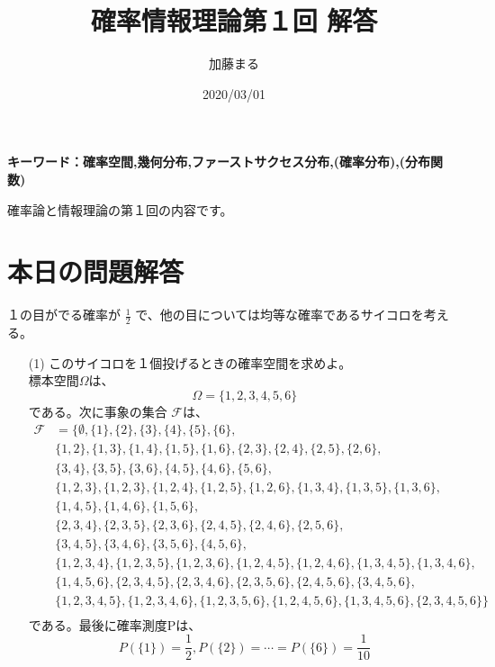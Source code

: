\documentclass[a4j,uplatex]{jsarticle}
\title{確率情報理論第１回 解答}
\author{加藤まる}
\date{2020/03/01}
\begin{document}
\maketitle
\bf キーワード：確率空間,幾何分布,ファーストサクセス分布,(確率分布),(分布関数)
\par \rm 確率論と情報理論の第１回の内容です。

\section*{本日の問題解答}
１の目がでる確率が $\frac{1}{2}$ で、他の目については均等な確率であるサイコロを考える。
\begin{itemize}
  \item[(1)] このサイコロを１個投げるときの確率空間を求めよ。 
  \\ 
  標本空間$\Omega $は、
  \begin{equation}
    \Omega = \{ 1,2,3,4,5,6 \} 
  \end{equation}
  である。次に事象の集合 $\mathscr F$は、
  \begin{equation}
    \begin{split}
       \mathscr F &= \{ \emptyset,\{ 1\},\{ 2\},\{ 3\},\{ 4\},\{ 5\},\{ 6\},\\
      &\{ 1,2\},\{ 1,3\},\{ 1,4\},\{ 1,5\},\{ 1,6\},\{ 2,3\},\{ 2,4\},\{ 2,5\},\{ 2,6\},\\
      &\{ 3,4\},\{ 3,5\},\{ 3,6\},\{ 4,5\},\{ 4,6\},\{ 5,6\},\\
      &\{ 1,2,3\},\{ 1,2,3\},\{ 1,2,4\},\{ 1,2,5\},\{ 1,2,6\},\{ 1,3,4\},\{ 1,3,5\},\{ 1,3,6\},\\
      &\{ 1,4,5\},\{ 1,4,6\},\{ 1,5,6\},\\
      &\{ 2,3,4\},\{ 2,3,5\},\{ 2,3,6\},\{ 2,4,5\},\{ 2,4,6\},\{ 2,5,6\},\\
      &\{ 3,4,5\},\{ 3,4,6\},\{ 3,5,6\},\{ 4,5,6\},\\
      &\{ 1,2,3,4\},\{ 1,2,3,5\},\{ 1,2,3,6\},\{ 1,2,4,5\},\{ 1,2,4,6\},\{ 1,3,4,5\},\{ 1,3,4,6\},\\
      &\{ 1,4,5,6\},\{ 2,3,4,5\},\{ 2,3,4,6\},\{ 2,3,5,6\},\{ 2,4,5,6\},\{ 3,4,5,6\},\\
      &\{ 1,2,3,4,5\},\{ 1,2,3,4,6\},\{ 1,2,3,5,6\},\{ 1,2,4,5,6\},\{ 1,3,4,5,6\},\{ 2,3,4,5,6\} \}\\
    \end{split}
  \end{equation}
  である。最後に確率測度Pは、
  \begin{equation}
    P(\{1\})=\frac{1}{2},P(\{2\})= \cdots = P(\{6\}) = \frac{1}{10}
  \end{equation}


\end{itemize}
\end{document}
